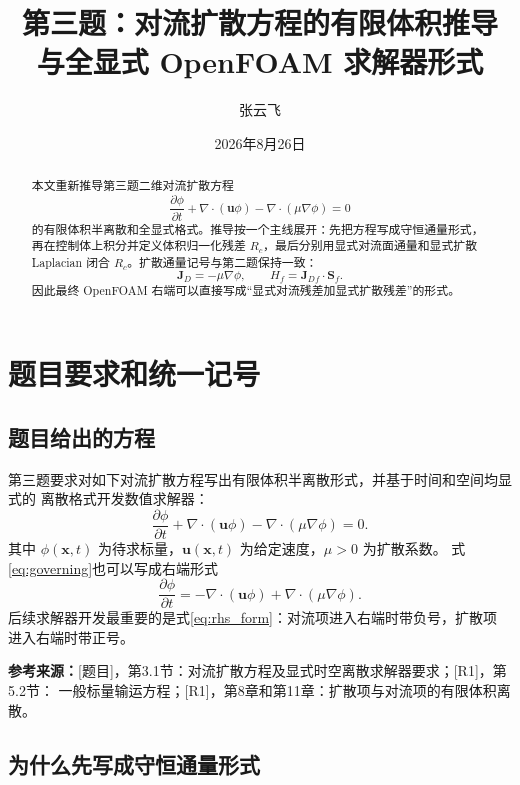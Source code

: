 \documentclass[UTF8,12pt,a4paper]{ctexart}
\title{\bfseries 第三题：对流扩散方程的有限体积推导\\与全显式 OpenFOAM 求解器形式}
\author{张云飞}
\date{2026年8月26日}
\numberwithin{equation}{section}
\newcommand{\Rone}{\textnormal{[R1]}}
\newcommand{\Task}{\textnormal{[题目]}}
\newcommand{\source}[1]{%
  \par\smallskip
  \noindent\colorbox{sourcebg}{%
    \parbox{0.955\linewidth}{\raggedright\footnotesize\color{sourcegray}\textbf{参考来源：}#1}%
  }
  \par\smallskip
}
\newcommand{\Sf}{\bm S}
\newcommand{\xf}{\bm x}
\newcommand{\uf}{\bm u}
\newcommand{\Jd}{\bm J_D}
\begin{document}
\maketitle

\begin{abstract}
本文重新推导第三题二维对流扩散方程
\[
  \frac{\partial\phi}{\partial t}
  +\nabla\cdot(\uf\phi)
  -\nabla\cdot(\mu\nabla\phi)=0
\]
的有限体积半离散和全显式格式。推导按一个主线展开：先把方程写成守恒通量形式，
再在控制体上积分并定义体积归一化残差 $R_c$，最后分别用显式对流面通量和显式扩散
Laplacian 闭合 $R_c$。扩散通量记号与第二题保持一致：
\[
  \Jd=-\mu\nabla\phi,\qquad H_f=\Jd{}_{f}\cdot\Sf_f.
\]
因此最终 OpenFOAM 右端可以直接写成“显式对流残差加显式扩散残差”的形式。
\end{abstract}

\tableofcontents
\newpage

\section{题目要求和统一记号}

\subsection{题目给出的方程}

第三题要求对如下对流扩散方程写出有限体积半离散形式，并基于时间和空间均显式的
离散格式开发数值求解器：
\begin{equation}
  \frac{\partial\phi}{\partial t}
  +\nabla\cdot(\uf\phi)
  -\nabla\cdot(\mu\nabla\phi)=0.
  \label{eq:governing}
\end{equation}
其中 $\phi(\xf,t)$ 为待求标量，$\uf(\xf,t)$ 为给定速度，$\mu>0$ 为扩散系数。
式\eqref{eq:governing}也可以写成右端形式
\begin{equation}
  \frac{\partial\phi}{\partial t}
  =
  -\nabla\cdot(\uf\phi)
  +
  \nabla\cdot(\mu\nabla\phi).
  \label{eq:rhs_form}
\end{equation}
后续求解器开发最重要的是式\eqref{eq:rhs_form}：对流项进入右端时带负号，扩散项
进入右端时带正号。

\source{\Task，第3.1节：对流扩散方程及显式时空离散求解器要求；\Rone，第5.2节：
一般标量输运方程；\Rone，第8章和第11章：扩散项与对流项的有限体积离散。}

\subsection{为什么先写成守恒通量形式}
\end{document}

